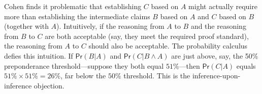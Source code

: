 \documentclass{article}
\newcommand{\pr}{\mathsf{Pr}}
\begin{document}
%
  Cohen finds it problematic that establishing $C$ based on $A$ might actually require more than establishing the intermediate claims $B$ based on $A$ and $C$ based on $B$ (together with $A$). Intuitively, if the reasoning from $A$ to $B$ and the reasoning from $B$ to $C$ are both acceptable (say, they meet the required proof standard), the reasoning from $A$ to $C$ should also be acceptable. The probability calculus defies this intuition.
  If $\pr(B \vert A)$ and $\pr(C \vert B \wedge A)$ are just above, say, the 50\% preponderance threshold---suppose they both equal  $51\%$---then $\pr(C \vert A)$ equals $51\%\times 51\%=26\%$, far below the $50\%$ threshold. 
  This is the inference-upon-inference objection. 
 
 
\end{document}
